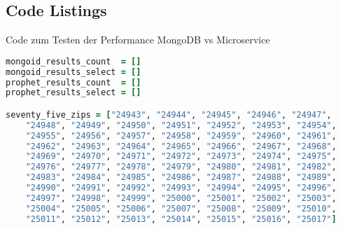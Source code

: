 \begin{appendix}


\chapter{Code Listings}

Code zum Testen der Performance MongoDB vs Microservice

\begin{lstlisting}[language=Ruby]
mongoid_results_count  = []
mongoid_results_select = []
prophet_results_count  = []
prophet_results_select = []

seventy_five_zips = ["24943", "24944", "24945", "24946", "24947",
    "24948", "24949", "24950", "24951", "24952", "24953", "24954",
    "24955", "24956", "24957", "24958", "24959", "24960", "24961",
    "24962", "24963", "24964", "24965", "24966", "24967", "24968",
    "24969", "24970", "24971", "24972", "24973", "24974", "24975",
    "24976", "24977", "24978", "24979", "24980", "24981", "24982",
    "24983", "24984", "24985", "24986", "24987", "24988", "24989",
    "24990", "24991", "24992", "24993", "24994", "24995", "24996",
    "24997", "24998", "24999", "25000", "25001", "25002", "25003",
    "25004", "25005", "25006", "25007", "25008", "25009", "25010",
    "25011", "25012", "25013", "25014", "25015", "25016", "25017"]
    

\end{lstlisting}
\end{appendix}

